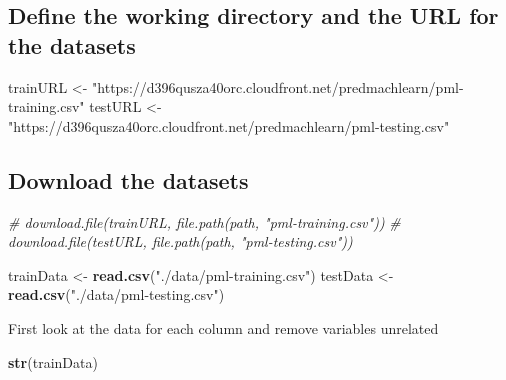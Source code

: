\documentclass[
]{article}
\newenvironment{Shaded}{\begin{snugshade}}{\end{snugshade}}
\newcommand{\CommentTok}[1]{\textcolor[rgb]{0.56,0.35,0.01}{\textit{#1}}}
\newcommand{\FunctionTok}[1]{\textcolor[rgb]{0.13,0.29,0.53}{\textbf{#1}}}
\newcommand{\NormalTok}[1]{#1}
\newcommand{\OtherTok}[1]{\textcolor[rgb]{0.56,0.35,0.01}{#1}}
\newcommand{\StringTok}[1]{\textcolor[rgb]{0.31,0.60,0.02}{#1}}
\begin{document}
\hypertarget{define-the-working-directory-and-the-url-for-the-datasets}{%
\subsection{Define the working directory and the URL for the
datasets}\label{define-the-working-directory-and-the-url-for-the-datasets}}

\begin{Shaded}
\begin{Highlighting}[]
\NormalTok{trainURL }\OtherTok{\textless{}{-}} \StringTok{"https://d396qusza40orc.cloudfront.net/predmachlearn/pml{-}training.csv"}
\NormalTok{testURL }\OtherTok{\textless{}{-}} \StringTok{"https://d396qusza40orc.cloudfront.net/predmachlearn/pml{-}testing.csv"}
\end{Highlighting}
\end{Shaded}

\hypertarget{download-the-datasets}{%
\subsection{Download the datasets}\label{download-the-datasets}}

\begin{Shaded}
\begin{Highlighting}[]
\CommentTok{\# download.file(trainURL, file.path(path, "pml{-}training.csv"))}
\CommentTok{\# download.file(testURL, file.path(path, "pml{-}testing.csv"))}

\NormalTok{trainData }\OtherTok{\textless{}{-}} \FunctionTok{read.csv}\NormalTok{(}\StringTok{"./data/pml{-}training.csv"}\NormalTok{)}
\NormalTok{testData }\OtherTok{\textless{}{-}} \FunctionTok{read.csv}\NormalTok{(}\StringTok{"./data/pml{-}testing.csv"}\NormalTok{)}
\end{Highlighting}
\end{Shaded}

First look at the data for each column and remove variables unrelated

\begin{Shaded}
\begin{Highlighting}[]
\FunctionTok{str}\NormalTok{(trainData)}
\end{Highlighting}
\end{Shaded}
\end{document}
